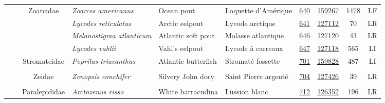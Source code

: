 \documentclass[12pt]{article}\usepackage[]{graphicx}\usepackage[]{color}
\begin{document}
\begin{landscape}
\begin{longtable}[t]{ccc>{\centering\arraybackslash}p{3cm}>{\centering\arraybackslash}p{3cm}>{\centering\arraybackslash}p{3cm}>{}c>{}ccc}
\hspace{1em}\hspace{1em} &  & Zoarcidae & \em{Zoarces americanus} & Ocean pout & Loquette d'Amérique & \href{#sec:640}{640} & \href{http://www.marinespecies.org/aphia.php?p=taxdetails&id=159267}{159267} & 1478 & LF\\
\nopagebreak
\hspace{1em}\hspace{1em} &  &  & \em{Lycodes reticulatus} & Arctic eelpout & Lycode arctique & \href{#sec:641}{641} & \href{http://www.marinespecies.org/aphia.php?p=taxdetails&id=127112}{127112} & 70 & LR\\
\nopagebreak
\hspace{1em}\hspace{1em} &  &  & \em{Melanostigma atlanticum} & Atlantic soft pout & Molasse atlantique & \href{#sec:646}{646} & \href{http://www.marinespecies.org/aphia.php?p=taxdetails&id=127120}{127120} & 43 & LR\\
\nopagebreak
\hspace{1em}\hspace{1em} &  &  & \em{Lycodes vahlii} & Vahl's eelpout & Lycode à carreaux & \href{#sec:647}{647} & \href{http://www.marinespecies.org/aphia.php?p=taxdetails&id=127118}{127118} & 565 & LI\\
\nopagebreak
\hspace{1em}\hspace{1em} &  & Stromateidae & \em{Peprilus triacanthus} & Atlantic butterfish & Stromaté fossette & \href{#sec:701}{701} & \href{http://www.marinespecies.org/aphia.php?p=taxdetails&id=159828}{159828} & 487 & LI\\
\nopagebreak
\addlinespace[0.3em]
\\
\hspace{1em}\hspace{1em} &  & Zeidae & \em{Zenopsis conchifer} & Silvery John dory & Saint Pierre argenté & \href{#sec:704}{704} & \href{http://www.marinespecies.org/aphia.php?p=taxdetails&id=127426}{127426} & 39 & LR\\
\nopagebreak
\addlinespace[0.3em]
\\
\hspace{1em}\hspace{1em} &  & Paralepididae & \em{Arctozenus risso} & White barracudina & Lussion blanc & \href{#sec:712}{712} & \href{http://www.marinespecies.org/aphia.php?p=taxdetails&id=126352}{126352} & 196 & LR\\

\end{longtable}
\end{landscape}
\end{document}

